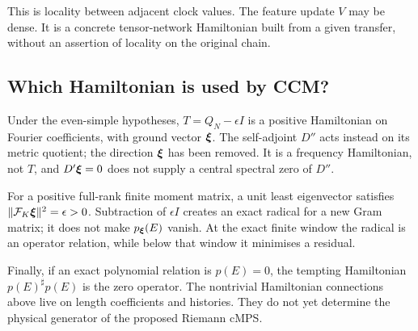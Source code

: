 This is locality between adjacent clock values. The feature update $V$
may be dense. It is a concrete tensor-network Hamiltonian built from a
given transfer, without an assertion of locality on the original chain.

\subsection{Which Hamiltonian is used by CCM?}

Under the even-simple hypotheses, $T=Q_N-\epsilon I$ is a positive
Hamiltonian on Fourier coefficients, with ground vector $\boldsymbol{\xi}$.
The self-adjoint $D''$ acts instead on its metric quotient; the direction
$\boldsymbol{\xi}$ has been removed. It is a frequency Hamiltonian, not $T$, and
$D'\boldsymbol{\xi}=0$ does not supply a central spectral zero of $D''$.

For a positive full-rank finite moment matrix, a unit least eigenvector
satisfies $\|\mathcal F_K\boldsymbol{\xi}\|^2=\epsilon>0$. Subtraction of
$\epsilon I$ creates an exact radical for a new Gram matrix; it does
not make $p_{\boldsymbol{\xi}}(E)$ vanish. At the exact finite window the radical is
an operator relation, while below that window it minimises a residual.

Finally, if an exact polynomial relation is $p(E)=0$, the tempting
Hamiltonian $p(E)^\sharp p(E)$ is the zero operator. The nontrivial
Hamiltonian connections above live on length coefficients and histories.
They do not yet determine the physical generator of the proposed
Riemann cMPS.
